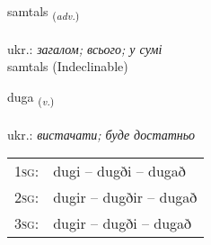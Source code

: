 \documentclass[frontgrid, backgrid]{flacards}\usepackage[]{graphicx}\usepackage[]{xcolor}
\begin{document}

\renewcommand{\flhead}{\vskip5pt \fboxsep=0pt {\small\bfseries\footnotesize Atviksorð | прислівник}}
\renewcommand{\fcfoot}{\vskip5pt \fboxsep=0pt \hspace{2pt}{\small\bfseries\footnotesize 2K}}

\renewcommand{\blhead}{\vskip5pt {\small\bfseries\footnotesize Atviksorð | прислівник }}
\renewcommand{\bcfoot}{\vskip5pt \hspace{2pt}{\small\bfseries\footnotesize 2K}}


{samtals \small{\textsubscript{(\textit{adv.})}} \\[1ex]
\textphonetic{[samtʰals]} \\
ukr.: \emph{загалом; всього; у сумі} \\  [2ex]
samtals (Indeclinable)}

\renewcommand{\flhead}{\vskip5pt \fboxsep=0pt {\small\bfseries\footnotesize Sagnorð | дієслово}}
\renewcommand{\fcfoot}{\vskip5pt \fboxsep=0pt \hspace{2pt}{\small\bfseries\footnotesize 2K}}

\renewcommand{\blhead}{\vskip5pt {\small\bfseries\footnotesize Sagnorð | дієслово }}
\renewcommand{\bcfoot}{\vskip5pt \hspace{2pt}{\small\bfseries\footnotesize 2K}}


{duga \small{\textsubscript{(\textit{v.})}} \\[1ex] %
\textphonetic{[tʏːɣa]} \\
ukr.: \emph{вистачати; буде достатньо} \\  [2ex]
\renewcommand*{\arraystretch}{0.8}
\begin{tabular}{p{1cm}l}
\textsc{1sg}: & dugi -- dugði -- dugað \\ 
\textsc{2sg}: & dugir -- dugðir -- dugað \\ 
\textsc{3sg}: & dugir -- dugði -- dugað \\ 
\end{tabular}
}
\end{document}
